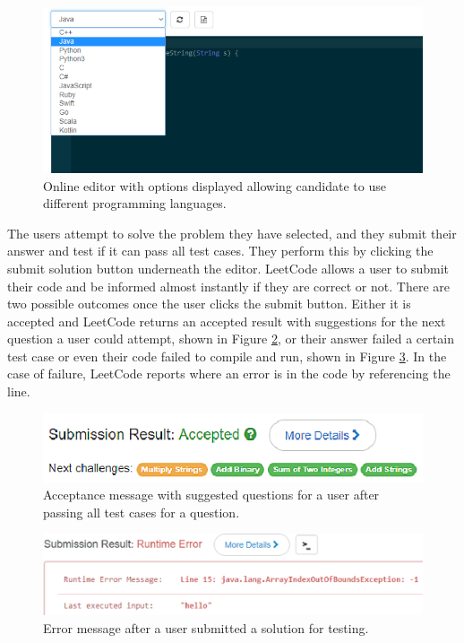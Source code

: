 \documentclass[conference]{IEEEtran}
\begin{document}
\begin{figure}[h]
\includegraphics[scale=0.4]{languageUI}
\caption{Online editor with options displayed allowing candidate to use different programming languages.}
\label{fig:langUI}
\end{figure}   
The users attempt to solve the problem they have selected, and they submit their answer and test if it can pass all test cases. They perform this by clicking the submit solution button underneath the editor. LeetCode allows a user to submit their code and be informed almost instantly if they are correct or not. There are two possible outcomes once the user clicks the submit button. Either it is accepted and LeetCode returns an accepted result with suggestions for the next question a user could attempt, shown in Figure \ref{fig:accepted}, or their answer failed a certain test case or even their code failed to compile and run, shown in Figure \ref{fig:fail}. In the case of failure, LeetCode reports where an error is in the code by referencing the line.  
\begin{figure}[h]
\includegraphics[scale=0.6]{accepted}
\caption{Acceptance message with suggested questions for a user after passing all test cases for a question.}
\label{fig:accepted}
\end{figure}  
\begin{figure}[h]
\includegraphics[scale=0.42]{failure}
\caption{Error message after a user submitted a solution for testing.}
\label{fig:fail}
\end{figure}    
\end{document}
